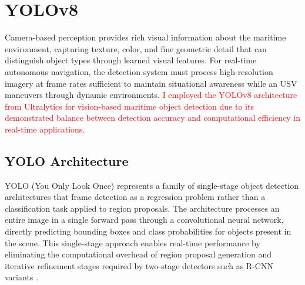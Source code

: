 


\section{YOLOv8} \label{yolo}

Camera-based perception provides rich visual information about the maritime environment, capturing texture, color, and fine geometric detail that can distinguish object types through learned visual features.
For real-time autonomous navigation, the detection system must process high-resolution imagery at frame rates sufficient to maintain situational awareness while an \ac{USV} maneuvers through dynamic environments.
\textcolor{red}{I employed the YOLOv8 architecture from Ultralytics for vision-based maritime object detection due to its demonstrated balance between detection accuracy and computational efficiency in real-time applications.}

\subsection{YOLO Architecture } \label{sec:yolo_architecture}

YOLO (You Only Look Once) represents a family of single-stage object detection architectures that frame detection as a regression problem rather than a classification task applied to region proposals.
The architecture processes an entire image in a single forward pass through a convolutional neural network, directly predicting bounding boxes and class probabilities for objects present in the scene.
This single-stage approach enables real-time performance by eliminating the computational overhead of region proposal generation and iterative refinement stages required by two-stage detectors such as R-CNN variants \cite{ultralytics}.

